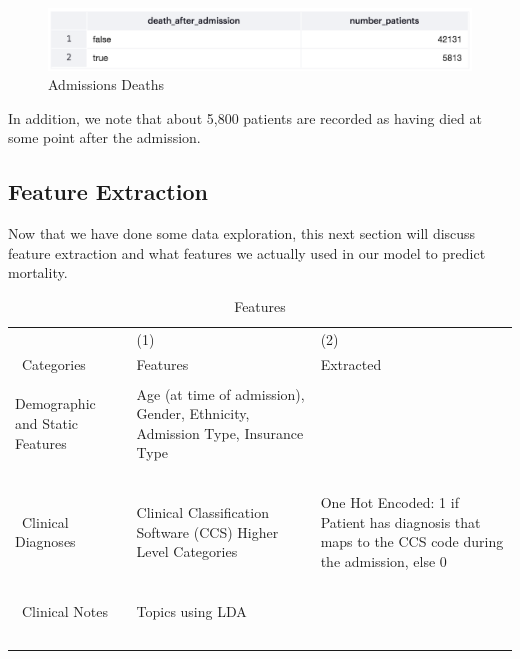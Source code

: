 \documentclass[12pt, final]{article}
\begin{document}
\begin{figure}[H]
\centering
\caption{Admissions Deaths}
\label{AdmissionsDeaths}
\includegraphics[page = {1}, scale = 0.4]{./images/admissions-deaths.png}
\end{figure}

In addition, we note that about 5,800 patients are recorded as having died at some point after the admission. 

\subsection{Feature Extraction}
Now that we have done some data exploration, this next section will discuss feature extraction and what features we actually used in our model to predict mortality.

\begin{table}[H]
\footnotesize
{}%
\caption{Features}
\label{Features}
\centering
\begin{tabularx}{\textwidth}{l C C}\hline
 & (1) & (2) \\\
Categories & Features & Extracted \\ \hline
 &  &   \\
Demographic and Static Features & Age (at time of admission), Gender, Ethnicity, Admission Type, Insurance Type &  \\\
\\\
Clinical Diagnoses & Clinical Classification Software (CCS) Higher Level Categories & One Hot Encoded: 1 if Patient has diagnosis that maps to the CCS code during the admission, else 0 \\\
\\\
Clinical Notes & Topics using LDA &  \\\
\end{tabularx}
\end{table}
\end{document}
